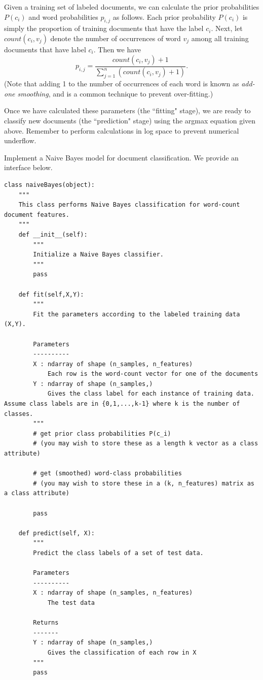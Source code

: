 Given a training set of labeled documents, we can calculate the prior probabilities $P(c_i)$ and word probabilities
$p_{i,j}$ as follows.
Each prior probability $P(c_i)$ is simply the proportion of training documents that have the label $c_i$.
Next, let $count(c_i,v_j)$ denote the number of occurrences of word $v_j$ among all training documents that have label $c_i$.
Then we have
\[
p_{i,j}  = \frac{count(c_i,v_j)+1}{\sum_{j=1}^n(count(c_i,v_j)+1)}.
\]
(Note that adding 1 to the number of occurrences of each word is known as \emph{add-one smoothing}, and is a
common technique to prevent over-fitting.)

Once we have calculated these parameters (the ``fitting" stage), we are ready to classify new documents
(the ``prediction" stage) using the argmax equation given above.
Remember to perform calculations in log space to prevent numerical underflow.

\begin{problem}
Implement a Naive Bayes model for document classification.
We provide an interface below.

\begin{lstlisting}
class naiveBayes(object):
    """
    This class performs Naive Bayes classification for word-count document features.
    """
    def __init__(self):
        """
        Initialize a Naive Bayes classifier.
        """
        pass

    def fit(self,X,Y):
        """
        Fit the parameters according to the labeled training data (X,Y).

        Parameters
        ----------
        X : ndarray of shape (n_samples, n_features)
            Each row is the word-count vector for one of the documents
        Y : ndarray of shape (n_samples,)
            Gives the class label for each instance of training data. Assume class labels are in {0,1,...,k-1} where k is the number of classes.
        """
        # get prior class probabilities P(c_i)
        # (you may wish to store these as a length k vector as a class attribute)

        # get (smoothed) word-class probabilities
        # (you may wish to store these in a (k, n_features) matrix as a class attribute)

        pass

    def predict(self, X):
        """
        Predict the class labels of a set of test data.

        Parameters
        ----------
        X : ndarray of shape (n_samples, n_features)
            The test data

        Returns
        -------
        Y : ndarray of shape (n_samples,)
            Gives the classification of each row in X
        """
        pass
\end{lstlisting}
\end{problem}

